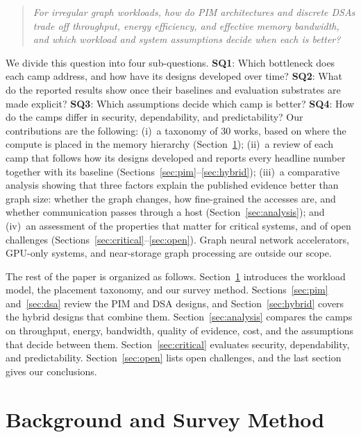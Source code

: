 \documentclass[journal,onecolumn]{IEEEtran}
\begin{document}
\begin{quote}\itshape
For irregular graph workloads, how do PIM architectures and discrete DSAs trade off throughput, energy efficiency, and effective memory bandwidth, and which workload and system assumptions decide when each is better?
\end{quote}

We divide this question into four sub-questions. \textbf{SQ1}: Which bottleneck does each camp address, and how have its designs developed over time? \textbf{SQ2}: What do the reported results show once their baselines and evaluation substrates are made explicit? \textbf{SQ3}: Which assumptions decide which camp is better? \textbf{SQ4}: How do the camps differ in security, dependability, and predictability? Our contributions are the following:
(i)~a taxonomy of 30 works, based on where the compute is placed in the memory hierarchy (Section~\ref{sec:background});
(ii)~a review of each camp that follows how its designs developed and reports every headline number together with its baseline (Sections~\ref{sec:pim}--\ref{sec:hybrid});
(iii)~a comparative analysis showing that three factors explain the published evidence better than graph size: whether the graph changes, how fine-grained the accesses are, and whether communication passes through a host (Section~\ref{sec:analysis});
and (iv)~an assessment of the properties that matter for critical systems, and of open challenges (Sections~\ref{sec:critical}--\ref{sec:open}).
Graph neural network accelerators, GPU-only systems, and near-storage graph processing are outside our scope.

The rest of the paper is organized as follows. Section~\ref{sec:background} introduces the workload model, the placement taxonomy, and our survey method. Sections~\ref{sec:pim} and~\ref{sec:dsa} review the PIM and DSA designs, and Section~\ref{sec:hybrid} covers the hybrid designs that combine them. Section~\ref{sec:analysis} compares the camps on throughput, energy, bandwidth, quality of evidence, cost, and the assumptions that decide between them. Section~\ref{sec:critical} evaluates security, dependability, and predictability. Section~\ref{sec:open} lists open challenges, and the last section gives our conclusions.

\section{Background and Survey Method}\label{sec:background}
\end{document}
